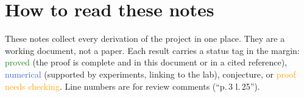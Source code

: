 \section*{How to read these notes}

These notes collect every derivation of the project in one place. They are a working document, not a paper.
Each result carries a status tag in the margin:
\textcolor{ForestGreen}{\textsf{proved}} (the proof is complete and in this document or in a cited reference),
\textcolor{RoyalBlue}{\textsf{numerical}} (supported by experiments, linking to the lab),
\textcolor{BrickRed}{\textsf{conjecture}}, or
\textcolor{Orange}{\textsf{proof needs checking}}.
Line numbers are for review comments (``p.\,3 l.\,25'').
